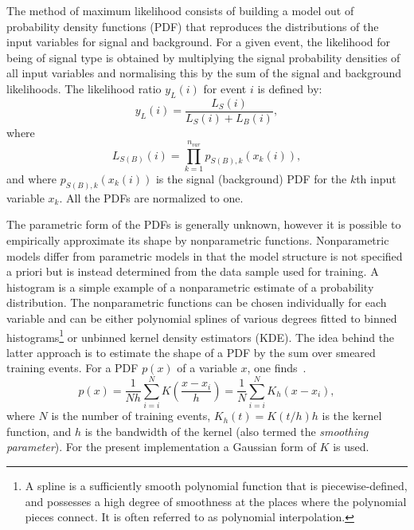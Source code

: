The method of maximum likelihood consists of building a model out of probability density functions (PDF) that reproduces the distributions of the input variables for signal and background. For a given event, the likelihood for being of signal type is obtained by multiplying the signal probability densities of all input variables %
and normalising this by the sum of the signal and background likelihoods. %
The likelihood ratio $y_{L}(i)$ for event $i$ is defined by:
%
\begin{equation}
y_{L}(i) = \frac{L_S(i)}{L_S(i)+L_B(i)},
\end{equation}
%
where
%
\begin{equation}
L_{S(B)}(i) = \prod^{n_{var}}_{k=1}  p_{S(B),k}(x_k(i)),
\end{equation}
%
and where $p_{S(B),k}(x_k(i))$ is the signal (background) PDF for the $k$th input variable $x_k$. All the PDFs are normalized to one. 

The parametric form of the PDFs is generally unknown, however it is possible to empirically approximate its shape %
by nonparametric functions. Nonparametric models differ from parametric models in that the model structure is not specified a priori but is instead determined from the data sample used for training.  A histogram is a simple example of a nonparametric estimate of a probability distribution.   The nonparametric functions can be chosen individually for each variable and can be either polynomial splines of various degrees fitted to binned histograms\footnote{A spline is a sufficiently smooth polynomial function that is piecewise-defined, and possesses a high degree of smoothness at the places where the polynomial pieces connect. It is often referred to as polynomial interpolation. } or unbinned kernel density estimators (KDE). The idea behind the latter approach is to estimate the shape of a PDF by the sum over smeared training events. For a PDF $p(x)$ of a variable $x$, one finds~\cite{KDE}. 
%
\begin{equation}
p(x) = \frac{1}{N h} \sum^N_{i=i} K(\frac{x-x_i}{h}) = \frac{1}{N} \sum^N_{i=i} K_h(x-x_i),
\end{equation}
%
where $N$ is the number of training events, $K_h(t) = K(t/h)h$ is the kernel function, and $h$ is the bandwidth of the kernel (also termed the \emph{smoothing parameter}). For the present implementation a Gaussian form of $K$ is used.  

